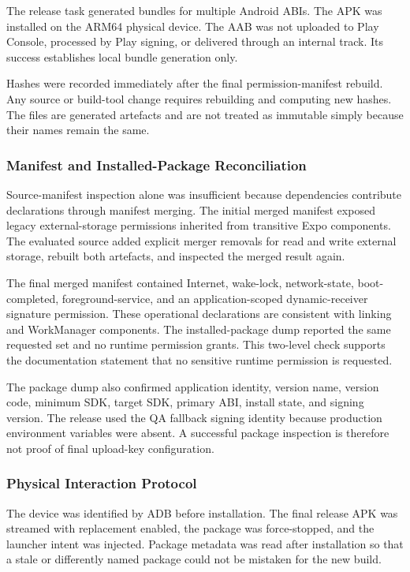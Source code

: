 The release task generated bundles for multiple Android ABIs. The APK was installed on the ARM64 physical device. The AAB was not uploaded to Play Console, processed by Play signing, or delivered through an internal track. Its success establishes local bundle generation only.

Hashes were recorded immediately after the final permission-manifest rebuild. Any source or build-tool change requires rebuilding and computing new hashes. The files are generated artefacts and are not treated as immutable simply because their names remain the same.

\subsubsection{Manifest and Installed-Package Reconciliation}

Source-manifest inspection alone was insufficient because dependencies contribute declarations through manifest merging. The initial merged manifest exposed legacy external-storage permissions inherited from transitive Expo components. The evaluated source added explicit merger removals for read and write external storage, rebuilt both artefacts, and inspected the merged result again.

The final merged manifest contained Internet, wake-lock, network-state, boot-completed, foreground-service, and an application-scoped dynamic-receiver signature permission. These operational declarations are consistent with linking and WorkManager components. The installed-package dump reported the same requested set and no runtime permission grants. This two-level check supports the documentation statement that no sensitive runtime permission is requested.

The package dump also confirmed application identity, version name, version code, minimum SDK, target SDK, primary ABI, install state, and signing version. The release used the QA fallback signing identity because production environment variables were absent. A successful package inspection is therefore not proof of final upload-key configuration.

\subsubsection{Physical Interaction Protocol}

The device was identified by ADB before installation. The final release APK was streamed with replacement enabled, the package was force-stopped, and the launcher intent was injected. Package metadata was read after installation so that a stale or differently named package could not be mistaken for the new build.

